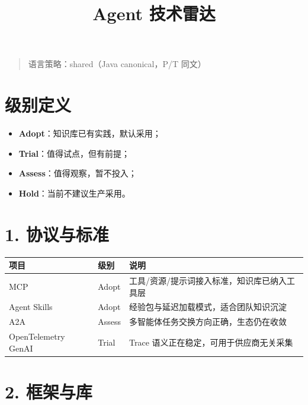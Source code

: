 \documentclass[9pt,a4paper,twocolumn]{ctexart}
\begin{document}
\title{Agent 技术雷达}
\date{}
\maketitle
{}

\begin{quote}
语言策略：shared（Java canonical，P/T 同文）
\end{quote}



\section*{级别定义}

\begin{itemize}[itemsep=1pt, topsep=2pt]
  \item \textbf{Adopt}：知识库已有实践，默认采用；
  \item \textbf{Trial}：值得试点，但有前提；
  \item \textbf{Assess}：值得观察，暂不投入；
  \item \textbf{Hold}：当前不建议生产采用。
\end{itemize}


\section*{1. 协议与标准}

{\footnotesize
\begin{tabular}{|p{}|p{}|p{}|}
\hline
\textbf{项目} & \textbf{级别} & \textbf{说明} \\
\hline
MCP & Adopt & 工具/资源/提示词接入标准，知识库已纳入工具层 \\
\hline
Agent Skills & Adopt & 经验包与延迟加载模式，适合团队知识沉淀 \\
\hline
A2A & Assess & 多智能体任务交换方向正确，生态仍在收敛 \\
\hline
OpenTelemetry GenAI & Trial & Trace 语义正在稳定，可用于供应商无关采集 \\
\hline
\end{tabular}
}



\section*{2. 框架与库}
\end{document}
